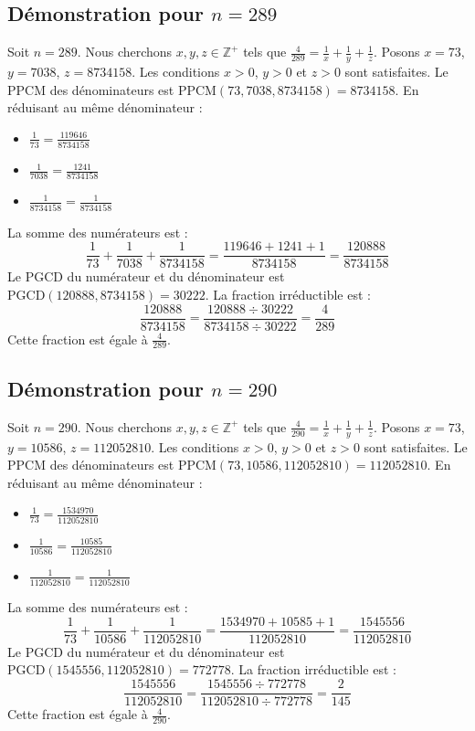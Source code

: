 \documentclass[11pt,a4paper]{article}
\begin{document}
\subsection{Démonstration pour $n = 289$}
Soit $n = 289$. Nous cherchons $x, y, z \in \mathbb{Z}^{+}$ tels que $\frac{4}{289} = \frac{1}{x} + \frac{1}{y} + \frac{1}{z}$.
Posons $x = 73$, $y = 7038$, $z = 8734158$.
Les conditions $x > 0$, $y > 0$ et $z > 0$ sont satisfaites.
Le PPCM des dénominateurs est $\text{PPCM}(73, 7038, 8734158) = 8734158$.
En réduisant au même dénominateur :
\begin{itemize}
    \item $\frac{1}{73} = \frac{119646}{8734158}$
    \item $\frac{1}{7038} = \frac{1241}{8734158}$
    \item $\frac{1}{8734158} = \frac{1}{8734158}$
\end{itemize}
La somme des numérateurs est :
$$ \frac{1}{73} + \frac{1}{7038} + \frac{1}{8734158} = \frac{119646 + 1241 + 1}{8734158} = \frac{120888}{8734158} $$
Le PGCD du numérateur et du dénominateur est $\text{PGCD}(120888, 8734158) = 30222$.
La fraction irréductible est :
$$ \frac{120888}{8734158} = \frac{120888 \div 30222}{8734158 \div 30222} = \frac{4}{289} $$
Cette fraction est égale à $\frac{4}{289}$.

\subsection{Démonstration pour $n = 290$}
Soit $n = 290$. Nous cherchons $x, y, z \in \mathbb{Z}^{+}$ tels que $\frac{4}{290} = \frac{1}{x} + \frac{1}{y} + \frac{1}{z}$.
Posons $x = 73$, $y = 10586$, $z = 112052810$.
Les conditions $x > 0$, $y > 0$ et $z > 0$ sont satisfaites.
Le PPCM des dénominateurs est $\text{PPCM}(73, 10586, 112052810) = 112052810$.
En réduisant au même dénominateur :
\begin{itemize}
    \item $\frac{1}{73} = \frac{1534970}{112052810}$
    \item $\frac{1}{10586} = \frac{10585}{112052810}$
    \item $\frac{1}{112052810} = \frac{1}{112052810}$
\end{itemize}
La somme des numérateurs est :
$$ \frac{1}{73} + \frac{1}{10586} + \frac{1}{112052810} = \frac{1534970 + 10585 + 1}{112052810} = \frac{1545556}{112052810} $$
Le PGCD du numérateur et du dénominateur est $\text{PGCD}(1545556, 112052810) = 772778$.
La fraction irréductible est :
$$ \frac{1545556}{112052810} = \frac{1545556 \div 772778}{112052810 \div 772778} = \frac{2}{145} $$
Cette fraction est égale à $\frac{4}{290}$.
\end{document}
